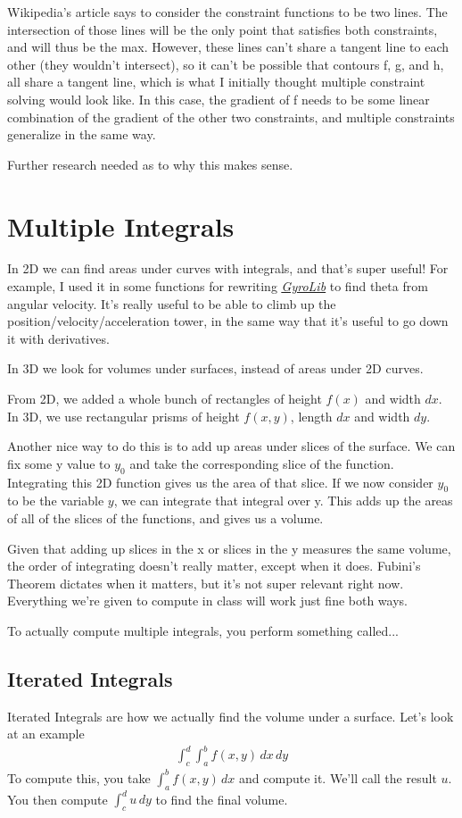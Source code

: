 \documentclass[12pt, letterpaper]{article}
\newcommand{\externalLink}[2]{\emph{\underline{\href{#1}{#2}}}}
\begin{document}
Wikipedia's article says to consider the constraint functions to be two lines.
The intersection of those lines will be the only point that satisfies both constraints, and will thus be the max.
However, these lines can't share a tangent line to each other (they wouldn't intersect), so it can't be possible that contours f, g, and h, all share a tangent line, which is what I initially thought multiple constraint solving would look like.
In this case, the gradient of f needs to be some linear combination of the gradient of the other two constraints, and multiple constraints generalize in the same way.

Further research needed as to why this makes sense.

\section{Multiple Integrals}
In 2D we can find areas under curves with integrals, and that's super useful!
For example, I used it in some functions for rewriting \externalLink{https://github.com/SAXTEN2011/GyroLib2020}{GyroLib} to find theta from angular velocity.
It's really useful to be able to climb up the position/velocity/acceleration tower, in the same way that it's useful to go down it with derivatives.

In 3D we look for volumes under surfaces, instead of areas under 2D curves.

From 2D, we added a whole bunch of rectangles of height $f(x)$ and width $dx$. 
In 3D, we use rectangular prisms of height $f(x, y)$, length $dx$ and width $dy$.

Another nice way to do this is to add up areas under slices of the surface. 
We can fix some y value to $y_0$ and take the corresponding slice of the function.
Integrating this 2D function gives us the area of that slice.
If we now consider $y_0$ to be the variable $y$, we can integrate that integral over y.
This adds up the areas of all of the slices of the functions, and gives us a volume.

Given that adding up slices in the x or slices in the y measures the same volume, the order of integrating doesn't really matter, except when it does.
Fubini's Theorem dictates when it matters, but it's not super relevant right now.
Everything we're given to compute in class will work just fine both ways.

To actually compute multiple integrals, you perform something called...
\subsection{Iterated Integrals}
Iterated Integrals are how we actually find the volume under a surface.
Let's look at an example
\begin{gather*}
    \int_c^d \int_a^b f(x, y) \,dx\,dy
\end{gather*}
To compute this, you take $\int_a^b f(x, y) \,dx$ and compute it. We'll call the result $u$.
You then compute $\int_c^d u\,dy$ to find the final volume.
\end{document}
